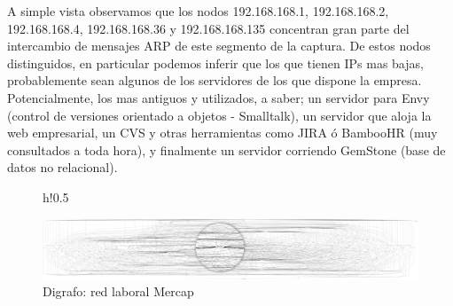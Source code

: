 A simple vista observamos que los nodos 192.168.168.1, 192.168.168.2, 192.168.168.4, 192.168.168.36 y 192.168.168.135 concentran gran parte del intercambio de mensajes ARP de este segmento de la captura. De estos nodos distinguidos, en particular podemos inferir que los que tienen IPs mas bajas, probablemente sean algunos de los servidores de los que dispone la empresa. Potencialmente, los mas antiguos y utilizados, a saber; un servidor para Envy (control de versiones orientado a objetos - Smalltalk), un servidor que aloja la web empresarial, un CVS y otras herramientas como JIRA ó BambooHR (muy consultados a toda hora), y finalmente un servidor corriendo GemStone (base de datos no relacional).

\begin{figure}{h!}{0.5\textwidth}
  \begin{center}
    \includegraphics[angle=90,scale=0.2]{./graficos/grafos-arp/grafo_laburo_eze1.png}
  \end{center}
  \caption{Digrafo: red laboral Mercap}
\end{figure}